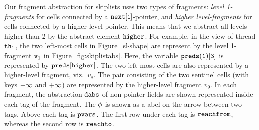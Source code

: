 
Our fragment abstraction for skiplists uses two types of fragments: {\em level 1-fragments} for
cells connected by a $\tt next[1]$-pointer, and {\em higher level-fragments} for
cells connected by a higher level pointer. This means that we abstract all levels
higher than 2 by the abstract element $\tt higher$.
For example, in the view of thread ${\tt th}_1$, the two left-most cells
in Figure~\ref{sl-shape} are represent by the level 1-fragment $\mathtt{v}_1$ in
Figure~\ref{fig:skiplistabs}. Here, the variable $\tt preds(1)[3]$ is represented by $\tt preds[higher]$. The two left-most cells are also represented by
a higher-level fragment, viz.\ $v_8$.
The pair consisting of the two sentinel cells (with keys $\tt -\infty$ and $\tt +\infty$) are represented by the higher-level fragment $v_9$. In each fragment, the abstraction $\mathtt{dabs}$ of non-pointer fields are shown represented inside each tag of the fragment. The $\phi$ is shown as a abel on the  arrow between two tags. Above each tag is $\mathtt{pvars}$. The first row under each tag is $\mathtt{reachfrom}$, whereas the second row is $\mathtt{reachto}$.

 

